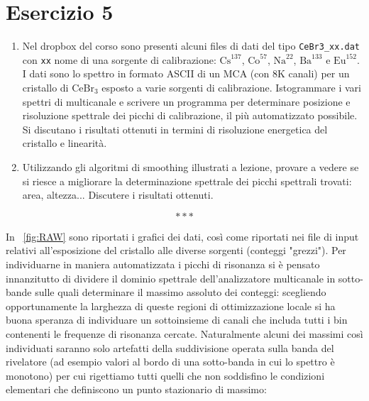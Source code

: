 \section{Esercizio 5}

\begin{enumerate}[label=\Alph*.]
	
	\item Nel dropbox del corso sono presenti alcuni files di dati del tipo \texttt{CeBr3\_xx.dat} con \texttt{xx} nome di una sorgente di calibrazione: $\mathrm{Cs}^{137}$, $\mathrm{Co}^{57}$, $\mathrm{Na}^{22}$, $\mathrm{Ba}^{133}$ e $\mathrm{Eu}^{152}$.\\
	I dati sono lo spettro in formato ASCII di un MCA (con 8K canali) per un cristallo di $\mathrm{CeBr}_3$ esposto a varie sorgenti di calibrazione. Istogrammare i vari spettri di multicanale e scrivere un programma per determinare posizione e risoluzione spettrale dei picchi di calibrazione, il più automatizzato possibile.\\
	Si discutano i risultati ottenuti in termini di risoluzione energetica del cristallo e linearità.
	\item Utilizzando gli algoritmi di smoothing illustrati a lezione, provare a vedere se si riesce a migliorare la determinazione spettrale dei picchi spettrali trovati: area, altezza... Discutere i risultati ottenuti. 
	
\end{enumerate}

\[* * * \] \smallskip

\noindent In \figurename~\ref{fig:RAW} sono riportati i grafici dei dati, così come riportati nei file di input relativi all'esposizione del cristallo alle diverse sorgenti (conteggi "grezzi"). Per individuarne in maniera automatizzata i picchi di risonanza si è pensato innanzitutto di dividere il dominio spettrale dell'analizzatore multicanale in sotto-bande sulle quali determinare il massimo assoluto dei conteggi: scegliendo opportunamente la larghezza di queste regioni di ottimizzazione locale si ha buona speranza di individuare un sottoinsieme di canali che includa tutti i bin contenenti le frequenze di risonanza cercate. Naturalmente alcuni dei massimi così individuati saranno solo artefatti della suddivisione operata sulla banda del rivelatore (ad esempio valori al bordo di una sotto-banda in cui lo spettro è monotono) per cui rigettiamo tutti quelli che non soddisfino le condizioni elementari che definiscono un punto stazionario di massimo:

